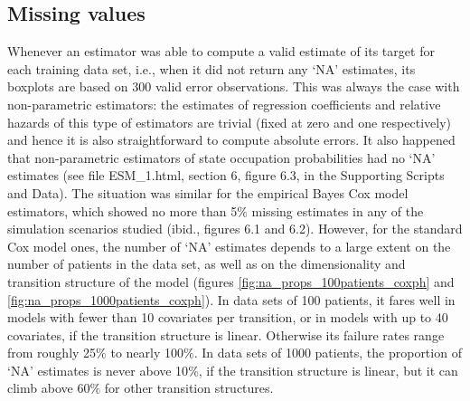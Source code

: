 \subsection{Missing values}
Whenever an estimator was able to compute a valid estimate of its target for each training data set,   i.e., when it did not return any `NA' estimates,  its boxplots are based on 300 valid error observations.  This was always the case with non-parametric estimators: the estimates of regression coefficients and relative hazards of this type of estimators are trivial (fixed at zero and one respectively) and hence it is also straightforward to compute absolute errors. 
 It also happened that non-parametric estimators of state occupation probabilities had no `NA' estimates (see file ESM\_1.html, section 6, figure 6.3, in the Supporting Scripts and Data). The situation was similar for the empirical Bayes Cox model estimators, which showed no more than 5$\%$ missing estimates in any of the simulation scenarios  studied (ibid., figures 6.1 and 6.2).  However, for the standard Cox model ones, the number of `NA' estimates  depends to a large extent on the number of patients in the data set, as well as on the dimensionality and transition structure of the model (figures \ref{fig:na_props_100patients_coxph} and \ref{fig:na_props_1000patients_coxph}). In data sets of 100 patients, it fares well in models with fewer than 10 covariates per transition, or in models with up to 40 covariates, if the transition structure is linear. Otherwise its failure rates range from roughly 25$\%$ to nearly 100$\%$. 
In data sets of 1000 patients, the proportion of `NA' estimates is never above 10$\%$, if the transition structure is linear, but it can climb above 60$\%$ for other transition structures. 

 
